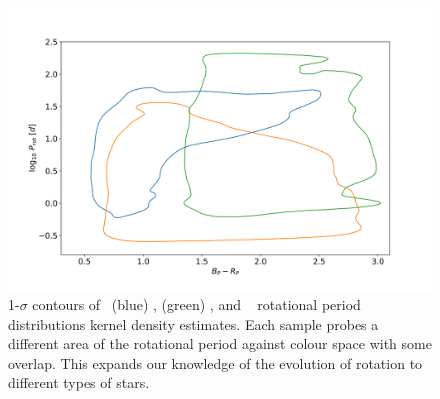 \begin{figure}[h]
    \includegraphics[width=\textwidth]{Figures/intro_figures/rot_comp.png}
    \caption[1-$\sigma$ contours of \kepler\ (blue), \ZTF\ (green), and \GDRT\ (orange) rotational period distributions kernel density estimates.]{1-$\sigma$ contours of \kepler\ (blue) \citep{mcquillan_rotation_2014}, \ZTF (green) \citep{lu_bridging_2022}, and \GDRT\ \citep{distefano_gaia_2022} rotational period distributions kernel density estimates. Each sample probes a different area of the rotational period against colour space with some overlap. This expands our knowledge of the evolution of rotation to different types of stars. }
    \label{fig:rot_comp}
\end{figure}

